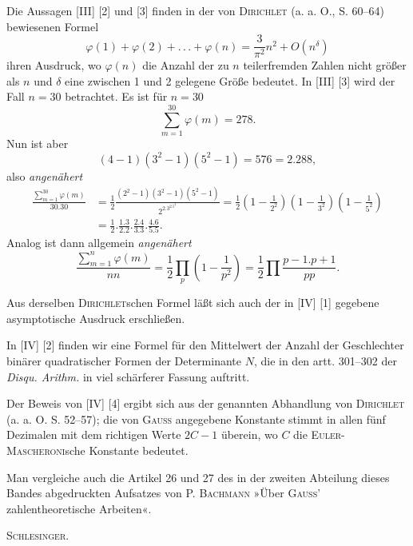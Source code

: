 Die Aussagen [III] [2] und [3] finden in der von \textsc{Dirichlet} (a. a. O., S. 60--64) bewiesenen Formel
\[
\varphi(1)+\varphi(2)+.\,.\,.+\varphi(n)=\frac3{\pi^2}n^2+O(n^\delta)
\]
ihren Ausdruck, wo \(\varphi(n)\) die Anzahl der zu \(n\) teilerfremden Zahlen nicht größer als \(n\) und \(\delta\) eine zwischen 1 und 2 gelegene Größe bedeutet. In [III] [3] wird der Fall \(n=30\) betrachtet. Es ist für \(n=30\)
\[
\sum_{m=1}^{30}\varphi(m)=278.
\]
\noindent Nun ist aber
\[
(4-1)(3^2-1)(5^2-1)=576=2.288,
\]
\noindent also \textit{angenähert}
\[
\begin{aligned}
\frac{\displaystyle\sum_{m=1}^{30}\varphi(m)}{30.30}
&=\frac12\frac{(2^2-1)(3^2-1)(5^2-1)}{2^2.3^2.5^2}
=\frac12\left(1-\frac1{2^2}\right)\left(1-\frac1{3^2}\right)\left(1-\frac1{5^2}\right)\\
&=\frac12.\frac{1.3}{2.2}.\frac{2.4}{3.3}.\frac{4.6}{5.5}.
\end{aligned}
\]
\noindent Analog ist dann allgemein \textit{angenähert}
\[
\frac{\displaystyle\sum_{m=1}^n\varphi(m)}{nn}
=\frac12\prod_p\left(1-\frac1{p^2}\right)
=\frac12\prod\frac{p-1.p+1}{pp}.
\]

Aus derselben \textsc{Dirichlet}schen Formel läßt sich auch der in [IV] [1] gegebene asymptotische Ausdruck erschließen.

In [IV] [2] finden wir eine Formel für den Mittelwert der Anzahl der Geschlechter binärer quadratischer Formen der Determinante \(N\), die in den artt. 301--302 der \textit{Disqu. Arithm.} in viel schärferer Fassung auftritt.

Der Beweis von [IV] [4] ergibt sich aus der genannten Abhandlung von \textsc{Dirichlet} (a. a. O. S. 52--57); die von \textsc{Gauss} angegebene Konstante stimmt in allen fünf Dezimalen mit dem richtigen Werte \(2C-1\) überein, wo \(C\) die \textsc{Euler-Mascheroni}sche Konstante bedeutet.

Man vergleiche auch die Artikel 26 und 27 des in der zweiten Abteilung dieses Bandes abgedruckten Aufsatzes von P. \textsc{Bachmann} »Über \textsc{Gauss}' zahlentheoretische Arbeiten«.
\begin{flushright}\textsc{Schlesinger}.\end{flushright}
\ClosingRule
\clearpage
\endgroup
